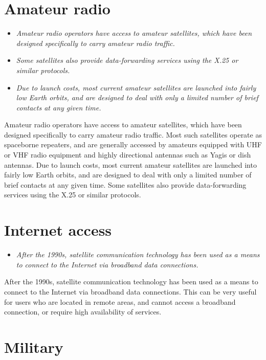 \section{Amateur radio}\label{amateur-radio}

\begin{itemize}
\item
  \emph{Amateur radio operators have access to amateur satellites, which
  have been designed specifically to carry amateur radio traffic.}
\item
  \emph{Some satellites also provide data-forwarding services using the
  X.25 or similar protocols.}
\item
  \emph{Due to launch costs, most current amateur satellites are
  launched into fairly low Earth orbits, and are designed to deal with
  only a limited number of brief contacts at any given time.}
\end{itemize}

Amateur radio operators have access to amateur satellites, which have
been designed specifically to carry amateur radio traffic. Most such
satellites operate as spaceborne repeaters, and are generally accessed
by amateurs equipped with UHF or VHF radio equipment and highly
directional antennas such as Yagis or dish antennas. Due to launch
costs, most current amateur satellites are launched into fairly low
Earth orbits, and are designed to deal with only a limited number of
brief contacts at any given time. Some satellites also provide
data-forwarding services using the X.25 or similar protocols.

\section{Internet access}\label{internet-access}

\begin{itemize}
\item
  \emph{After the 1990s, satellite communication technology has been
  used as a means to connect to the Internet via broadband data
  connections.}
\end{itemize}

After the 1990s, satellite communication technology has been used as a
means to connect to the Internet via broadband data connections. This
can be very useful for users who are located in remote areas, and cannot
access a broadband connection, or require high availability of services.

\section{Military}\label{military}

